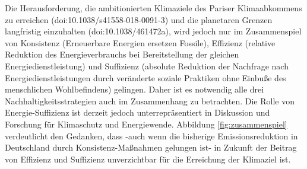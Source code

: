 \documentclass[a4paper,11pt,twoside]{scrartcl}
\begin{document}


Die Herausforderung, die ambitionierten Klimaziele des Pariser Klimaabkommens zu erreichen (doi:10.1038/s41558-018-0091-3) und die planetaren Grenzen langfristig einzuhalten (doi:10.1038/461472a), wird jedoch nur im Zusammenspiel von Konsistenz (Erneuerbare Energien ersetzen Fossile), Effizienz (relative Reduktion des Energieverbrauchs bei Bereitstellung der gleichen Energiedienstleistung) und Suffizienz (absolute Reduktion der Nachfrage nach Energiedienstleistungen durch veränderte soziale Praktiken ohne Einbuße des menschlichen Wohlbefindens) gelingen. Daher ist es notwendig alle drei Nachhaltigkeitsstrategien auch im Zusammenhang zu betrachten. Die Rolle von Energie-Suffizienz ist derzeit jedoch unterrepräsentiert in Diskussion und Forschung für Klimaschutz und Energiewende. Abbildung \ref{fig:zusammenspiel} verdeutlicht den Gedanken, dass -auch wenn die bisherige Emissionsreduktion in Deutschland durch Konsistenz-Maßnahmen gelungen ist- in Zukunft der Beitrag von Effizienz und Suffizienz unverzichtbar für die Erreichung der Klimaziel ist.
\end{document}
